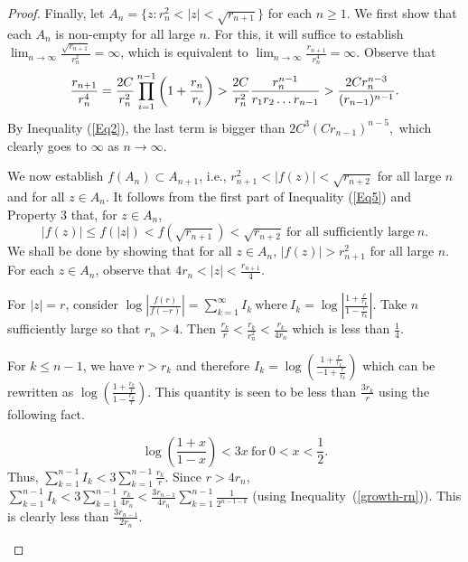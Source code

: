 \documentclass[11pt,a4paper]{article}
\begin{document}
\begin{proof}
	\par Finally, let $A_n=\{z:r_n^2<|z|<\sqrt{r_{n+1}}\}$ for each $n \geq 1$. We first show that each $A_n$ is non-empty for all large $n$. For this, it will suffice to establish $ \lim_{n \to \infty}\frac{\sqrt{r_{n+1}}}{r_n^2} =\infty$, which is  equivalent to $\lim_{n \to \infty}\frac{r_{n+1}}{r_n^4} = \infty$. Observe that 
	\begin{equation}
		\frac{r_{n+1}}{r_n^4}=\frac{2C}{r^2_n}\prod_{i=1}^{n-1}\left(1+\frac{r_n}{r_i}\right) >\frac{2C}{r^2_n}\frac{r^{n-1}_n}{r_1r_2\ldots r_{n-1}} >\frac{2Cr^{n-3}_n}{  (r_{n-1})^{n-1}}.\\
\label{quotient-rn}\end{equation}
By Inequality (\ref{Eq2}), the last term is bigger than 
 $ 2C^3 (C r_{n-1})^{n-5},$  which clearly goes to $\infty$ as $n\to\infty$.	
 \par We now establish  $f(A_n) \subset A_{n+1}$, i.e., $r_{n+1}^2 < |f(z)| <\sqrt{r_{n+2}}$ for all large $n$ and for all $z \in A_n$.
It follows from the first part of Inequality (\ref{Eq5}) and Property 3 that, for $z\in A_n$, $$|f(z)|\leq f(|z|)<f({\sqrt{r_{n+1}}})<{\sqrt{r _{n+2}}} ~\mbox{for all sufficiently large}~ n.$$
We shall be done by showing that  for all $z \in A_n$,  $|f(z)| > r_{n+1}^2$ for all large $n$. For each $z \in A_n$, observe that $4r_n < |z| < \frac{r_{n+1}}{4}$.



 For $|z|=r$, consider $\log \left|\frac{f(r)}{f(-r)}\right|=\sum_{k=1}^{\infty} I_k ~\mbox{where}~ I_k= \log\left|\frac{1+\frac{r}{r_k}}{1-\frac{r}{r_k}}\right|.$ 
 Take $n$ sufficiently large so that $r_n>4$. Then  $\frac{r_k}{r} < \frac{r_k}{r_n ^2} < \frac{r_k}{4 r_n}$ which is less than $\frac{1}{4}$. 
 
 
For $k \leq n-1$, we have $r>r_k$ and therefore $I_k =\log \left(\frac{1+\frac{r}{r_k}}{-1+\frac{r}{r_k}}\right)  $ which can be rewritten as $\log \left(\frac{1+\frac{r_k}{r}}{1-\frac{r_k}{r}}\right)$. This quantity is seen to be less than $\frac{3 r_k}{r}$ using the following fact.

	\begin{equation}\label{Eq8}
	\log\left(\frac{1+x}{1-x}\right)<3x ~\mbox{for}~ 0<x<\frac{1}{2}.
\end{equation} 
 Thus, $\sum_{k=1}^{n-1}I_k<3\sum_{k=1}^{n-1}\frac{r_k}{r}.$ Since $r> 4r_n$, $\sum_{k=1}^{n-1}I_k<3\sum_{k=1}^{n-1}\frac{r_k}{4r_n} < \frac{3 r_{n-1}}{4 r_n}\sum_{k=1}^{n-1}\frac{1}{2^{n-1-k}} $ (using Inequality~(\ref{growth-rn})). This is clearly less than $\frac{3 r_{n-1}}{2r_n}$.
 \begin{figure}
	\begin{center}
		

\end{center}
\end{figure}
\end{proof}
\end{document}
